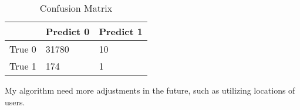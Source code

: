 \begin{table}
    \centering
    \caption{Confusion Matrix}\label{tbl:confusion}
    \begin{tabular}{p{1.5in}p{1.5in}p{1.5in}}\toprule
               & Predict 0 & Predict 1 \\ \midrule
        True 0 &    31780  &      10  \\
        True 1 &      174  &       1   \\ \bottomrule
    \end{tabular}
\end{table}

My algorithm need more adjustments in the future, such as utilizing locations of users.

%
%



